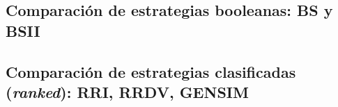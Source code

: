 \subsection{Comparación de estrategias booleanas: BS y BSII}


\subsection{Comparación de estrategias clasificadas (\textit{ranked}): RRI, RRDV, GENSIM }